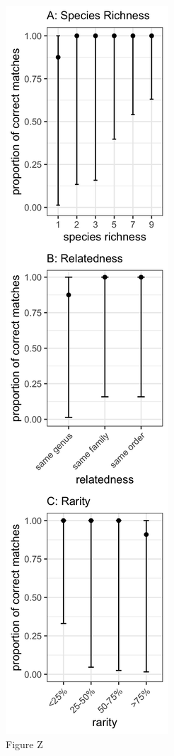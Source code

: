 \documentclass[
]{article}
\begin{document}
\begin{figure}
\centering
\includegraphics{figZ_combined.jpg}
\caption{Figure Z}
\end{figure}
\end{document}
